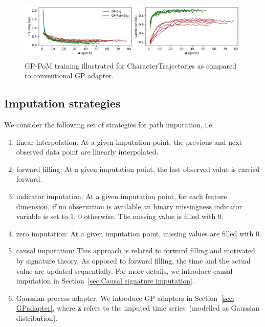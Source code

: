 \documentclass{article}
\begin{document}
\begin{figure}[tbp] 
    \begin{center}
    \includegraphics[width=0.95\linewidth]{plots/gp_training_plot.pdf}\quad%
  \end{center}
  \caption{GP-PoM training illustrated for CharacterTrajectories as compared to conventional GP adapter.}
  \label{supp: gp-training}
\end{figure}



\subsection{Imputation strategies} \label{supp: Imputation}

We consider the following set of strategies for path imputation, i.e.\
\begin{enumerate}
    \item linear interpolation: At a given imputation point, the previous and next observed data point are linearly interpolated.
    \item forward filling: At a given imputation point, the last observed value is carried forward.
    \item indicator imputation: At a given imputation point, for each feature dimension, if no observation is available an binary missingness indicator variable is set to $1$, $0$ otherwise. The missing value is filled with $0$.
    \item zero imputation: At a given imputation point, missing values are filled with $0$.
    \item causal imputation: This approach is related to forward filling
      and motivated by signature theory. As opposed to forward filling,
      the time and the actual value are updated sequentially. For more
      details, we introduce causal imputation in Section~\ref{sec:Causal signature imputation}.
    \item Gaussian process adapter: We introduce GP adapters in
      Section~\ref{sec: GPadapter}, where $\mathbf{z}$
      refers to the imputed time series~(modelled as Gaussian
      distribution).
\end{enumerate}
\end{document}

